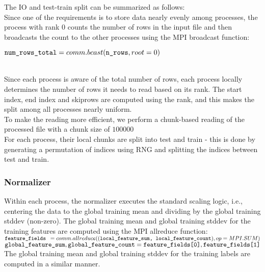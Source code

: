 \documentclass{article}
\begin{document}
The IO and test-train split can be summarized as follows: \\

Since one of the requirements is to store data nearly evenly among processes, the process with rank $0$ counts the number of rows in the input file and then broadcasts the count to the other processes using the MPI broadcast function:\\
    
\begin{code}
$\verb|num_rows_total| = comm.bcast(\verb|n_rows|, root=0)$       
\end{code} \\

Since each process is aware of the total number of rows, each process locally determines the number of rows it needs to read based on its rank. The start index, end index and skiprows are computed using the rank, and this makes the split among all processes nearly uniform. \\

To make the reading more efficient, we perform a chunk-based reading of the processed file with a chunk size of $100000$ \\
 
For each process, their local chunks are split into test and train - this is done by generating a permutation of indices using RNG and splitting the indices between test and train.

\subsubsection{Normalizer}
Within each process, the normalizer executes the standard scaling logic, i.e., centering the data to the global training mean and dividing by the global training stddev (non-zero).
The global training mean and global training stddev for the training features are computed using the MPI allreduce function:\\

$\verb|feature_fields |= comm.allreduce((\verb|local_feature_sum, local_feature_count|), op=MPI.SUM)$ \\
$\verb|global_feature_sum|, \verb|global_feature_count| = \verb|feature_fields[0]|, \verb|feature_fields[1]|$ \\

The global training mean and global training stddev for the training labels are computed in a similar manner. \\
\end{document}
